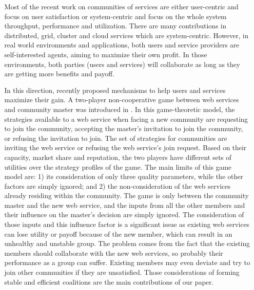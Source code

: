 \documentclass[10pt,journal,cspaper,compsoc]{IEEEtran}
\begin{document}
Most of the recent work on communities of services are either
user-centric and focus on user satisfaction
\cite{Chun02user-centricperformance} or system-centric and focus
on the whole system throughput, performance and utilization. There
are many contributions in distributed, grid, cluster and cloud
services which are system-centric. However, in real world
environments and applications, both users and service providers
are self-interested agents, aiming to maximize their own profit.
In those environments, both parties (users and services) will
collaborate as long as they are getting more benefits and payoff.

In this direction, recently \cite{DBLP:conf/IEEEscc/LimTMB12,
DBLP:conf/IEEEscc/KhosravifarABT11, 10.1109/TSC.2012.12} proposed
mechanisms to help users and services maximize their gain. A
two-player non-cooperative game between web services and community
master was introduced in
\cite{DBLP:conf/IEEEscc/KhosravifarABT11}. In this game-theoretic
model, the strategies available to a web service when facing a new
community are requesting to join the community, accepting the
master's invitation to join the community, or refusing the
invitation to join. The set of strategies for communities are
inviting the web service or refusing the web service's join
request. Based on their capacity, market share and reputation, the
two players have different sets of utilities over the strategy
profiles of the game. The main limits of this game model are: 1)
its consideration of only three quality parameters, while the
other factors are simply ignored; and 2) the non-consideration of
the web services already residing within the community. The game
is only between the community master and the new web service, and
the inputs from all the other members and their influence on the
master's decision are simply ignored. The consideration of those
inputs and this influence factor is a significant issue as
existing web services can lose utility or payoff because of the
new member, which can result in an unhealthy and unstable group.
The problem comes from the fact that the existing members should
collaborate with the new web services, so probably their
performance as a group can suffer. Existing members may even
deviate and try to join other communities if they are unsatisfied.
Those considerations of forming stable and efficient coalitions
are the main contributions of our paper.
\end{document}
